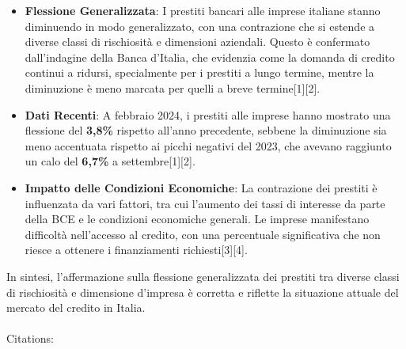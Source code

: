 \documentclass[
  letterpaper,
  DIV=11,
  numbers=noendperiod]{scrartcl}
\makeatletter
\let\oldparagraph\paragraph
\renewcommand{\paragraph}{
    \@ifstar
      \xxxParagraphStar
      \xxxParagraphNoStar
  }
\newcommand{\xxxParagraphStar}[1]{\oldparagraph*{#1}\mbox{}}
\newcommand{\xxxParagraphNoStar}[1]{\oldparagraph{#1}\mbox{}}
\makeatother
\begin{document}
\begin{itemize}
\item
  \textbf{Flessione Generalizzata}: I prestiti bancari alle imprese
  italiane stanno diminuendo in modo generalizzato, con una contrazione
  che si estende a diverse classi di rischiosità e dimensioni aziendali.
  Questo è confermato dall'indagine della Banca d'Italia, che evidenzia
  come la domanda di credito continui a ridursi, specialmente per i
  prestiti a lungo termine, mentre la diminuzione è meno marcata per
  quelli a breve termine{[}1{]}{[}2{]}.
\item
  \textbf{Dati Recenti}: A febbraio 2024, i prestiti alle imprese hanno
  mostrato una flessione del \textbf{3,8\%} rispetto all'anno
  precedente, sebbene la diminuzione sia meno accentuata rispetto ai
  picchi negativi del 2023, che avevano raggiunto un calo del
  \textbf{6,7\%} a settembre{[}1{]}{[}2{]}.
\item
  \textbf{Impatto delle Condizioni Economiche}: La contrazione dei
  prestiti è influenzata da vari fattori, tra cui l'aumento dei tassi di
  interesse da parte della BCE e le condizioni economiche generali. Le
  imprese manifestano difficoltà nell'accesso al credito, con una
  percentuale significativa che non riesce a ottenere i finanziamenti
  richiesti{[}3{]}{[}4{]}.
\end{itemize}

\begin{tcolorbox}[enhanced jigsaw, bottomrule=.15mm, opacityback=0, leftrule=.75mm, breakable, titlerule=0mm, left=2mm, title=\textcolor{quarto-callout-warning-color}{\faExclamationTriangle}\hspace{0.5em}{Conclusione}, colframe=quarto-callout-warning-color-frame, coltitle=black, colback=white, toprule=.15mm, colbacktitle=quarto-callout-warning-color!10!white, bottomtitle=1mm, toptitle=1mm, arc=.35mm, rightrule=.15mm, opacitybacktitle=0.6]

In sintesi, l'affermazione sulla flessione generalizzata dei prestiti
tra diverse classi di rischiosità e dimensione d'impresa è corretta e
riflette la situazione attuale del mercato del credito in Italia.

\end{tcolorbox}

\paragraph{Citations:}\label{citations-3}
\end{document}
